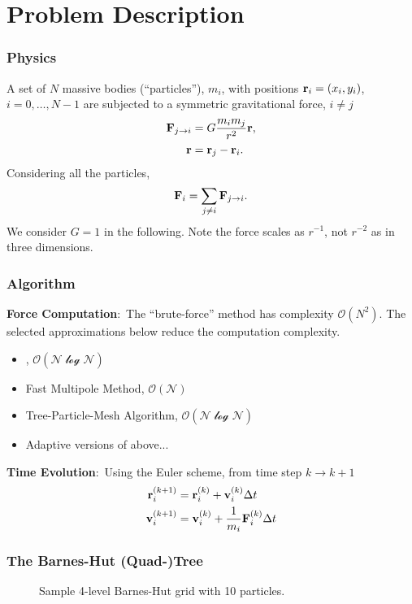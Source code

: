 \section{Problem Description}

\begin{frame}
	\frametitle{Physics}
	A set of $N$ massive bodies (``particles''), $m_i$, with positions $\mvec{r}_i=(x_i,y_i)$, $i=0,\ldots,N-1$ are subjected to a symmetric gravitational force, $i\neq j$
	\begin{align*}
		\mvec{F}_{j\rightarrow i} &= G\frac{m_im_j}{r^2}\mvec{r},\\
		\mvec{r} &= \mvec{r}_j-\mvec{r}_i.
	\end{align*}
	Considering all the particles,
	\begin{align*}
		\mvec{F}_i = \sum_{j\neq i} \mvec{F}_{j\rightarrow i}.
	\end{align*}
	We consider $G=1$ in the following. Note the force scales as $r^{-1}$, not $r^{-2}$ as in three dimensions.
\end{frame}

\begin{frame}
\frametitle{Algorithm}
\textbf{Force Computation}:~The ``brute-force'' method has complexity $\mathcal{O}(N^2)$. The selected approximations below reduce the computation complexity.
\begin{itemize}
	\item {}, $\mathcal{O(N\log{N})}$ \parencite{Barnes1986}
	\item Fast Multipole Method, $\mathcal{O(N)}$ \parencite{Rokhlin1985}
	\item Tree-Particle-Mesh Algorithm, $\mathcal{O(N\log{N})}$ \parencite{Bagla2002}
	\item Adaptive versions of above...
\end{itemize}
\pause
\textbf{Time Evolution}:~Using the \alert{Euler scheme}, from time step $k\to k+1$
\begin{align}
	\mvec{r}^{(k+1)}_i &= \mvec{r}^{(k)}_i + \mvec{v}^{(k)}_i\Delta t\\
	\mvec{v}^{(k+1)}_i &= \mvec{v}^{(k)}_i + \frac{1}{m_i}\mvec{F}^{(k)}_i\Delta t
\end{align}
\end{frame}

\begin{frame}
	\frametitle{The Barnes-Hut (Quad-)Tree}
	\begin{figure}
		\centering
		\begin{tikzpicture}[scale=0.05,%
			every circle node/.style = {width=3,fill=black}]
			
		\end{tikzpicture}
		\caption{Sample 4-level Barnes-Hut grid with 10 particles.}
		\label{fig:bh-grid}
	\end{figure}
\end{frame}

